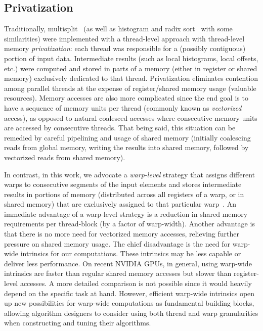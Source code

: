\subsection{Privatization}\label{subsec:ms_privatization}
Traditionally, multisplit~\cite{He:2008:RJG} (as well as histogram and radix sort~\cite{Bell:2011:TAP,Merrill:2015:CUB} with some similarities) were implemented with a thread-level approach with thread-level memory \emph{privatization}: each thread was responsible for a (possibly contiguous) portion of input data.
Intermediate results (such as local histograms, local offsets, etc.) were computed and stored in parts of a memory (either in register or shared memory) exclusively dedicated to that thread.
Privatization eliminates contention among parallel threads at the expense of register/shared memory usage (valuable resources).
Memory accesses are also more complicated since the end goal is to have a sequence of memory units per thread (commonly known as \emph{vectorized} access), as opposed to natural coalesced accesses where consecutive memory units are accessed by consecutive threads. That being said, this situation can be remedied by careful pipelining and usage of shared memory (initially coalescing reads from global memory, writing the results into shared memory, followed by vectorized reads from shared memory).

In contrast, in this work, we advocate a \emph{warp-level} strategy that assigns different warps to consecutive segments of the input elements and stores intermediate results in portions of memory (distributed across all registers of a warp, or in shared memory) that are exclusively assigned to that particular warp~\cite{Ashkiani:2016:GM}.
An immediate advantage of a warp-level strategy is a reduction in shared memory requirements per thread-block (by a factor of warp-width).
Another advantage is that there is no more need for vectorized memory accesses, relieving further pressure on shared memory usage.
The chief disadvantage is the need for warp-wide intrinsics for our computations. These intrinsics may be less capable or deliver less performance. On recent NVIDIA GPUs, in general, using warp-wide intrinsics are faster than regular shared memory accesses but slower than register-level accesses.
A more detailed comparison is not possible since it would heavily depend on the specific task at hand.
However, efficient warp-wide intrinsics open up new possibilities for warp-wide computations as fundamental building blocks, allowing algorithm designers to consider using both thread and warp granularities when constructing and tuning their algorithms.
